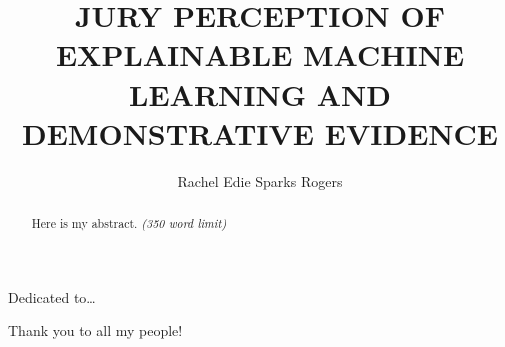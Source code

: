 \documentclass[print]{nuthesis}
\begin{document}
\frontmatter
\title{JURY PERCEPTION OF EXPLAINABLE MACHINE LEARNING AND DEMONSTRATIVE EVIDENCE}
\author{Rachel Edie Sparks Rogers}
\maketitle


\begin{abstract}
    Here is my abstract. \emph{(350 word limit)}
\end{abstract}

\begin{copyrightpage}
\end{copyrightpage}

\begin{dedication}
Dedicated to\ldots{}
\end{dedication}

\begin{acknowledgments}
Thank you to all my people!
\end{acknowledgments}


\tableofcontents

\listoffigures
\listoftables

\mainmatter
\end{document}
